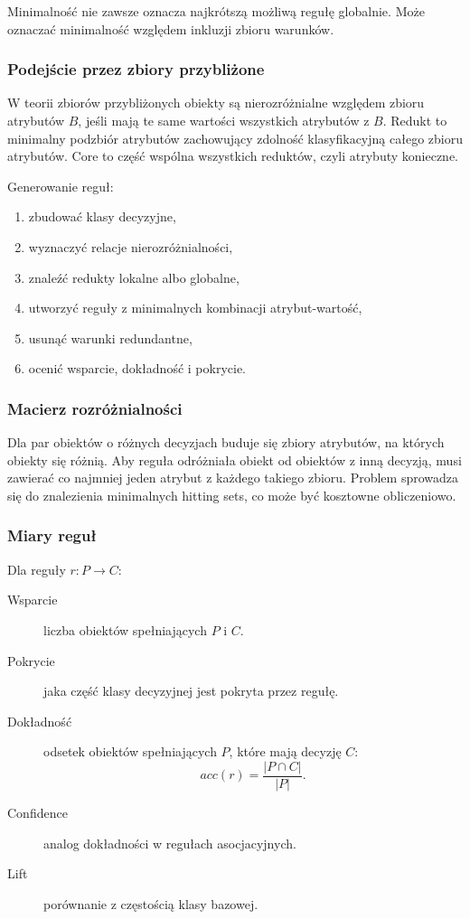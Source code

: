 Minimalność nie zawsze oznacza najkrótszą możliwą regułę globalnie. Może oznaczać minimalność względem inkluzji zbioru warunków.

\subsubsection{Podejście przez zbiory przybliżone}

W teorii zbiorów przybliżonych obiekty są nierozróżnialne względem zbioru atrybutów $B$, jeśli mają te same wartości wszystkich atrybutów z $B$. Redukt to minimalny podzbiór atrybutów zachowujący zdolność klasyfikacyjną całego zbioru atrybutów. Core to część wspólna wszystkich reduktów, czyli atrybuty konieczne.

Generowanie reguł:
\begin{enumerate}
  \item zbudować klasy decyzyjne,
  \item wyznaczyć relacje nierozróżnialności,
  \item znaleźć redukty lokalne albo globalne,
  \item utworzyć reguły z minimalnych kombinacji atrybut-wartość,
  \item usunąć warunki redundantne,
  \item ocenić wsparcie, dokładność i pokrycie.
\end{enumerate}

\subsubsection{Macierz rozróżnialności}

Dla par obiektów o różnych decyzjach buduje się zbiory atrybutów, na których obiekty się różnią. Aby reguła odróżniała obiekt od obiektów z inną decyzją, musi zawierać co najmniej jeden atrybut z każdego takiego zbioru. Problem sprowadza się do znalezienia minimalnych hitting sets, co może być kosztowne obliczeniowo.

\subsubsection{Miary reguł}

Dla reguły $r: P\to C$:
\begin{description}
  \item[Wsparcie] liczba obiektów spełniających $P$ i $C$.
  \item[Pokrycie] jaka część klasy decyzyjnej jest pokryta przez regułę.
  \item[Dokładność] odsetek obiektów spełniających $P$, które mają decyzję $C$:
  \[
  acc(r)=\frac{|P\cap C|}{|P|}.
  \]
  \item[Confidence] analog dokładności w regułach asocjacyjnych.
  \item[Lift] porównanie z częstością klasy bazowej.
\end{description}

